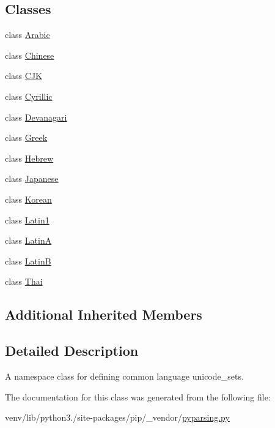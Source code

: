 \subsection*{Classes}
\begin{DoxyCompactItemize}
\item 
class \hyperlink{classpip_1_1__vendor_1_1pyparsing_1_1pyparsing__unicode_1_1Arabic}{Arabic}
\item 
class \hyperlink{classpip_1_1__vendor_1_1pyparsing_1_1pyparsing__unicode_1_1Chinese}{Chinese}
\item 
class \hyperlink{classpip_1_1__vendor_1_1pyparsing_1_1pyparsing__unicode_1_1CJK}{C\+JK}
\item 
class \hyperlink{classpip_1_1__vendor_1_1pyparsing_1_1pyparsing__unicode_1_1Cyrillic}{Cyrillic}
\item 
class \hyperlink{classpip_1_1__vendor_1_1pyparsing_1_1pyparsing__unicode_1_1Devanagari}{Devanagari}
\item 
class \hyperlink{classpip_1_1__vendor_1_1pyparsing_1_1pyparsing__unicode_1_1Greek}{Greek}
\item 
class \hyperlink{classpip_1_1__vendor_1_1pyparsing_1_1pyparsing__unicode_1_1Hebrew}{Hebrew}
\item 
class \hyperlink{classpip_1_1__vendor_1_1pyparsing_1_1pyparsing__unicode_1_1Japanese}{Japanese}
\item 
class \hyperlink{classpip_1_1__vendor_1_1pyparsing_1_1pyparsing__unicode_1_1Korean}{Korean}
\item 
class \hyperlink{classpip_1_1__vendor_1_1pyparsing_1_1pyparsing__unicode_1_1Latin1}{Latin1}
\item 
class \hyperlink{classpip_1_1__vendor_1_1pyparsing_1_1pyparsing__unicode_1_1LatinA}{LatinA}
\item 
class \hyperlink{classpip_1_1__vendor_1_1pyparsing_1_1pyparsing__unicode_1_1LatinB}{LatinB}
\item 
class \hyperlink{classpip_1_1__vendor_1_1pyparsing_1_1pyparsing__unicode_1_1Thai}{Thai}
\end{DoxyCompactItemize}
\subsection*{Additional Inherited Members}


\subsection{Detailed Description}
\begin{DoxyVerb}A namespace class for defining common language unicode_sets.
\end{DoxyVerb}
 

The documentation for this class was generated from the following file\+:\begin{DoxyCompactItemize}
\item 
venv/lib/python3./site-\/packages/pip/\+\_\+vendor/\hyperlink{pip_2__vendor_2pyparsing_8py}{pyparsing.\+py}\end{DoxyCompactItemize}
